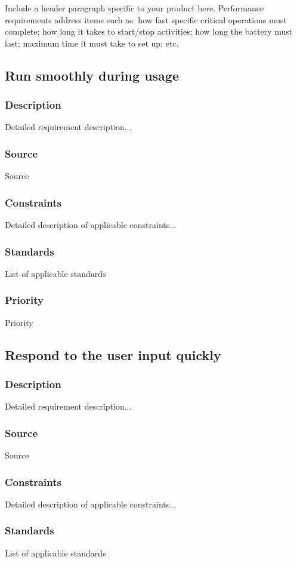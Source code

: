 Include a header paragraph specific to your product here. Performance requirements address items such as: how fast specific critical operations must complete; how long it takes to start/stop activities; how long the battery must last; maximum time it must take to set up; etc.

\subsection{Run smoothly during usage }
\subsubsection{Description}
Detailed requirement description...
\subsubsection{Source}
Source
\subsubsection{Constraints}
Detailed description of applicable constraints...
\subsubsection{Standards}
List of applicable standards
\subsubsection{Priority}
Priority

\subsection{Respond to the user input quickly }
\subsubsection{Description}
Detailed requirement description...
\subsubsection{Source}
Source
\subsubsection{Constraints}
Detailed description of applicable constraints...
\subsubsection{Standards}
List of applicable standards
